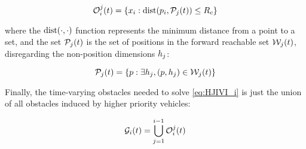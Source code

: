 \begin{equation}
\mathcal{O}_i^j(t) = \{x_i: \text{dist}(p_i, \mathcal{P}_j(t)) \le R_c \}
\end{equation}

\noindent where the $\text{dist}(\cdot, \cdot)$ function represents the minimum distance from a point to a set, and the set $\mathcal{P}_j(t)$ is the set of positions in the forward reachable set $\mathcal{W}_j(t)$, disregarding the non-position dimensions $h_j$:

\begin{equation}
\mathcal{P}_j(t) = \{p: \exists h_j, (p, h_j) \in \mathcal{W}_j(t)\}
\end{equation}

Finally, the time-varying obstacles needed to solve \eqref{eq:HJIVI_i} is just the union of all obstacles induced by higher priority vehicles:

\begin{equation}
\mathcal{G}_i(t) = \bigcup_{j=1}^{i-1}\mathcal{O}_i^j(t)
\end{equation}